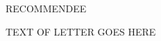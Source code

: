 \documentclass[12pt,recommendation,nosign]{university_recommendation}
\begin{document}
\signature{MYNAME, Professor of Philosophy\\\url{MY EMAIL ADDRESS}}

\begin{letter}{RECOMMENDEE}
\opening{}

TEXT OF LETTER GOES HERE

\closing{}
\end{letter}

		
\end{document}
